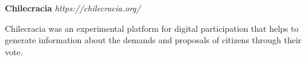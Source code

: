 \item
\headerrow
{\textbf{Chilecracia}}
{\emph{https://chilecracia.org/}}
\begin{itemize*}
    \item Chilecracia was an experimental platform for digital participation that 
    helps to generate information about the demands and proposals of citizens 
    through their vote.
\end{itemize*}
